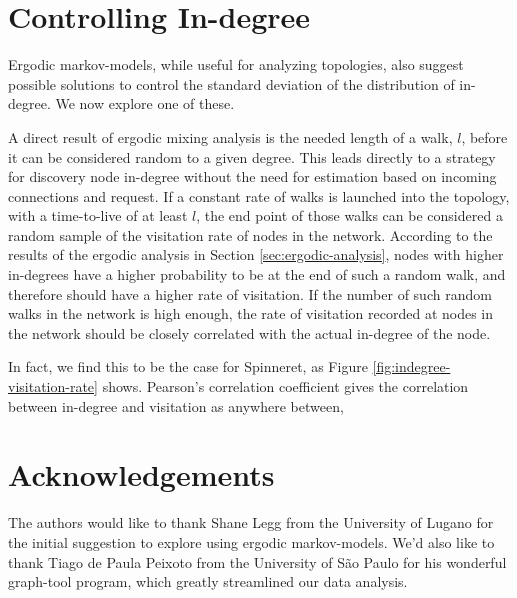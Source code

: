 \documentclass[a4paper,12pt]{article}
\begin{document}
\section{Controlling In-degree}

Ergodic markov-models, while useful for analyzing topologies, also suggest
possible solutions to control the standard deviation of the distribution of
in-degree.  We now explore one of these.

A direct result of ergodic mixing analysis is the needed length of a walk, $l$,
before it can be considered random to a given degree.  This leads directly to a
strategy for discovery node in-degree without the need for estimation based on
incoming connections and request.  If a constant rate of walks is launched into
the topology, with a time-to-live of at least $l$, the end point of those walks
can be considered a random sample of the visitation rate of nodes in the
network.  According to the results of the ergodic analysis in Section
\ref{sec:ergodic-analysis}, nodes with higher in-degrees have a higher
probability to be at the end of such a random walk, and therefore should have a
higher rate of visitation.  If the number of such random walks in the network
is high enough, the rate of visitation recorded at nodes in the network should
be closely correlated with the actual in-degree of the node.

In fact, we find this to be the case for Spinneret, as Figure
\ref{fig:indegree-visitation-rate} shows.  Pearson's correlation coefficient
gives the correlation between in-degree and visitation as anywhere between, 



\section*{Acknowledgements}
The authors would like to thank Shane Legg from the University of Lugano for
the initial suggestion to explore using ergodic markov-models.  We'd also like
to thank Tiago de Paula Peixoto from the University of São Paulo for his
wonderful graph-tool program, which greatly streamlined our data analysis.

%
%
\end{document}
